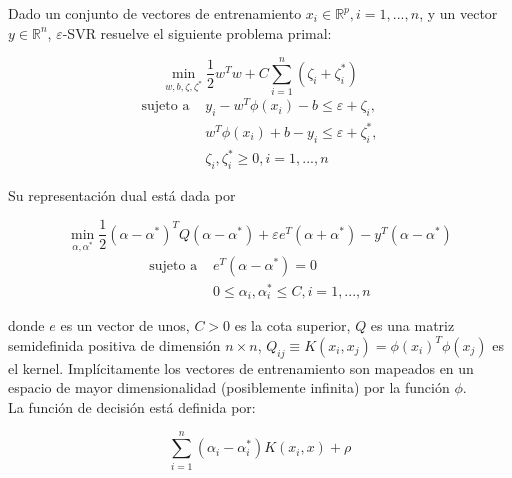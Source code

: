 \documentclass[spanish]{article}
\begin{document}
          Dado un conjunto de vectores de entrenamiento $x_i \in \mathbb{R}^p, i=1, ..., n$, y un vector 
          $y \in \mathbb{R}^n$, $\varepsilon$-SVR resuelve el siguiente problema primal:
          
          \begin{equation}
            \min_ {w, b, \zeta, \zeta^*} \frac{1}{2} w^T w + C \sum_{i=1}^{n} (\zeta_i + \zeta_i^*) 
            \nonumber
          \end{equation}
          \begin{equation}
            \begin{split}
              \textrm {sujeto a } & y_i - w^T \phi (x_i) - b \leq \varepsilon + \zeta_i,\\
                & w^T \phi (x_i) + b - y_i \leq \varepsilon + \zeta_i^*,\\
                & \zeta_i, \zeta_i^* \geq 0, i=1, ..., n
            \end{split}
          \end{equation}

          Su representación dual está dada por
          
          \begin{equation}
            \min_{\alpha, \alpha^*} \frac{1}{2} (\alpha - \alpha^*)^T Q (\alpha - \alpha^*) 
              + \varepsilon e^T (\alpha + \alpha^*) - y^T (\alpha - \alpha^*)
            \nonumber
          \end{equation}
          \begin{equation}
            \begin{split}
              \textrm {sujeto a } & e^T (\alpha - \alpha^*) = 0 \\
                & 0 \leq \alpha_i, \alpha_i^* \leq C, i=1, ..., n
            \end{split}
          \end{equation}

          donde $e$ es un vector de unos, $C > 0$ es la cota superior, $Q$ es una matriz semidefinida 
          positiva de dimensión $n \times n$, $Q_{ij} \equiv K(x_i, x_j) = \phi (x_i)^T \phi (x_j)$ es 
          el kernel. Implícitamente los vectores de entrenamiento son mapeados en un espacio de mayor 
          dimensionalidad (posiblemente infinita) por la función $\phi$. \\
          
          La función de decisión está definida por:
          
          \begin{equation}
            \sum_{i=1}^n (\alpha_i - \alpha_i^*) K(x_i, x) + \rho
          \end{equation}
          
\end{document}
